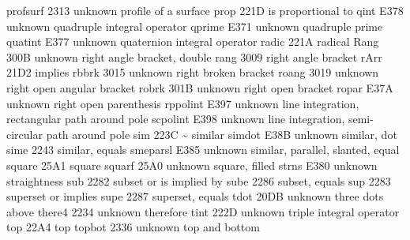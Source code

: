  profsurf                         2313 {unknown} profile of a surface
 prop                             221D {\propto} is proportional to
 qint                             E378 {unknown} quadruple integral operator
 qprime                           E371 {unknown} quadruple prime
 quatint                          E377 {unknown} quaternion integral operator
 radic                            221A {\surd} radical
 Rang                             300B {unknown} right angle bracket, double
 rang                             3009 {\rangle} right angle bracket
 rArr                             21D2 {\Rightarrow} implies
 rbbrk                            3015 {unknown} right broken bracket
 roang                            3019 {unknown} right open angular bracket
 robrk                            301B {unknown} right open bracket
 ropar                            E37A {unknown} right open parenthesis
 rppolint                         E397 {unknown} line integration, rectangular path around pole
 scpolint                         E398 {unknown} line integration, semi-circular path around pole
 sim                              223C {\sim} similar
 simdot                           E38B {unknown} similar, dot
 sime                             2243 {\simeq} similar, equals
 smeparsl                         E385 {unknown} similar, parallel, slanted, equal
 square                           25A1 {\square} square
 squarf                           25A0 {unknown} square, filled
 strns                            E380 {unknown} straightness
 sub                              2282 {\subset} subset or is implied by
 sube                             2286 {\subseteq} subset, equals
 sup                              2283 {\supset} superset or implies
 supe                             2287 {\supseteq} superset, equals
 tdot                             20DB {unknown} three dots above
 there4                           2234 {unknown} therefore
 tint                             222D {unknown} triple integral operator
 top                              22A4 {\top} top
 topbot                           2336 {unknown} top and bottom

